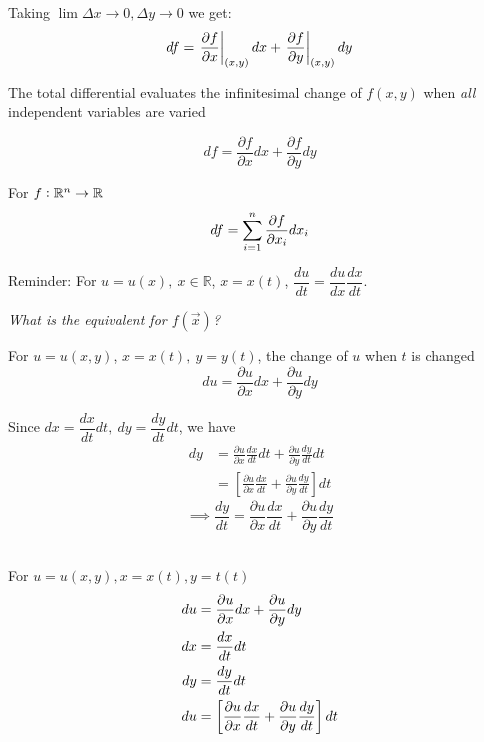 \documentclass[twoside]{scrartcl}
\begin{document}
Taking $\lim \Delta x \to 0, \Delta y \to 0$ we get:
\[df = \left.\frac{\partial f}{\partial x}\right|_{(x,y)}dx + \left.\frac{\partial f}{\partial y}\right|_{(x,y)}dy\]


\begin{definition}  The total differential evaluates the infinitesimal change of $f(x,y)$ when \emph{all} independent variables are varied

\[df = \frac{\partial f}{\partial x}dx + \frac{\partial f}{\partial y}dy\]

For $f: \mathbb{R}^n \to \mathbb{R}$
\[df = \sum_{i=1}^n \frac{\partial f}{\partial x_i}dx_i\]
\end{definition}


Reminder: For $u = u(x),~ x \in \mathbb{R}$, $x = x(t)$, $\dfrac{du}{dt} = \dfrac{du}{dx}\dfrac{dx}{dt}$. 

\emph{What is the equivalent for $f(\vec{x})$?}

For $u = u(x,y)$, $x = x(t),~y = y(t)$, the change of $u$ when $t$ is changed
\[du = \frac{\partial u}{\partial x}dx + \frac{\partial u}{\partial y}dy\]

Since $dx = \dfrac{dx}{dt}dt,~ dy = \dfrac{dy}{dt}dt$, we have
\[\begin{aligned}dy &= \frac{\partial u}{\partial x}\frac{dx}{dt}dt + \frac{\partial u}{\partial y}\frac{dy}{dt}dt\\
&= \left[\frac{\partial u}{\partial x}\frac{dx}{dt} + \frac{\partial u}{\partial y}\frac{dy}{dt}\right]dt
\end{aligned}
\]
\begin{equation}
\implies \boxed{\frac{dy}{dt} = \frac{\partial u}{\partial x}\frac{dx}{dt} + \frac{\partial u}{\partial y}\frac{dy}{dt}}
\end{equation}~

For $u = u(x,y), x = x(t), y=t(t)$
\[
\begin{aligned}
  du &= \frac{\partial u}{\partial x}dx + \frac{\partial u}{\partial y}dy\\
  dx &= \frac{dx}{dt}dt\\
  dy &= \frac{dy}{dt}dt\\
  du &= \left[\frac{\partial u}{\partial x}\frac{dx}{dt} + \frac{\partial u}{\partial y}\frac{dy}{dt}\right]dt
\end{aligned}
\]
\end{document}
